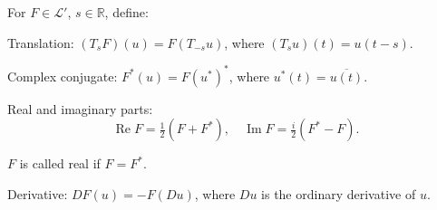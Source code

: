 For $F \in \mathcal{L}'$, $s \in \mathbb{R}$, define:

Translation: $(T_s F)(u) = F(T_{-s} u)$, where $(T_s u)(t) = u(t - s)$.

Complex conjugate: $F^*(u) = F(u^*)^*$, where $u^*(t) = \overline{u(t)}$.

Real and imaginary parts:
$$\operatorname{Re} F = \tfrac{1}{2}(F + F^*), \quad \operatorname{Im} F = \tfrac{i}{2}(F^* - F).$$

$F$ is called real if $F = F^*$.

Derivative: $DF(u) = -F(Du)$, where $Du$ is the ordinary derivative of $u$.

